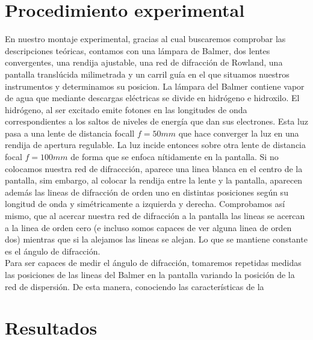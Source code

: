 \documentclass{article}
\begin{document}
\section{Procedimiento experimental}
En nuestro montaje experimental, gracias al cual buscaremos comprobar las descripciones teóricas, contamos con una  lámpara de Balmer, dos lentes convergentes, una rendija ajustable, una red de difracción de Rowland, una pantalla translúcida milimetrada y un carril guía en el que situamos nuestros instrumentos y determinamos su posicion.
La lámpara del Balmer contiene vapor de agua que mediante descargas eléctricas se divide en hidrógeno e hidroxilo. El hidrógeno, al ser excitado emite fotones en las longitudes de onda correspondientes a los saltos de niveles de energía que dan sus electrones. Esta luz pasa a una lente de distancia focall $f = 50 mm$ que hace converger la luz en una rendija de apertura regulable. La luz incide entonces sobre otra lente de distancia focal $f = 100 mm$ de forma que se enfoca nítidamente en la pantalla. Si no colocamos nuestra red de difraccción, aparece una linea blanca en el centro de la pantalla, sim embargo, al colocar la rendija entre la lente y la pantalla, aparecen además las lineas de difracción de orden uno en distintas posiciones según su longitud de onda y simétricamente a izquierda y derecha. Comprobamos así mismo, que al acercar nuestra red de difracción a la pantalla las lineas se acercan a la linea de orden cero (e incluso somos capaces de ver alguna linea de orden dos) mientras que si la alejamos las lineas se alejan. Lo que se mantiene constante es el ángulo de difracción.\\
Para ser capaces de medir el ángulo de difracción, tomaremos repetidas medidas las posiciones de las lineas del Balmer en la pantalla variando la posición de la red de dispersión. De esta manera, conociendo las características de la 
\section{Resultados}
\end{document}
